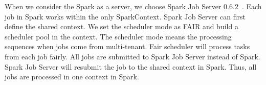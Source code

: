 
When we consider the Spark as a server, we choose Spark Job Server 0.6.2~\cite{www:jobserver}. Each job in Spark works within the only {\ttfamily \small SparkContext}. Spark Job Server can first define the shared context. We set the scheduler mode as FAIR and build a scheduler pool in the context. The scheduler mode means the processing sequences when jobs come from multi-tenant. Fair scheduler will process tasks from each job fairly. All jobs are submitted to Spark Job Server instead of Spark. Spark Job Server will resubmit the job to the shared context in Spark. Thus, all jobs are processed in one context in Spark.